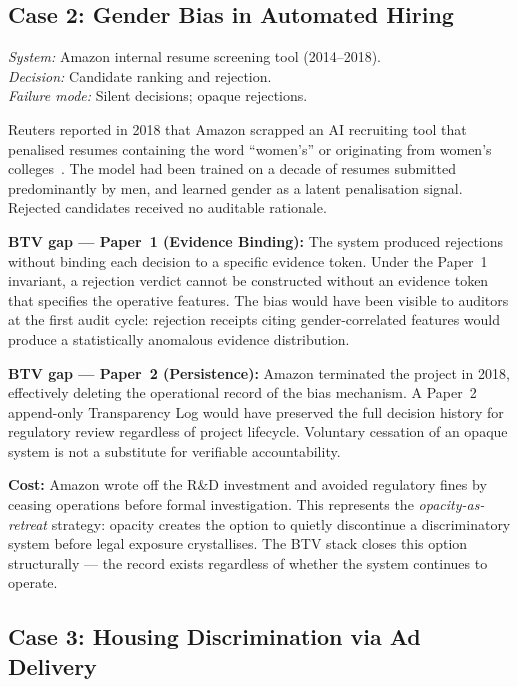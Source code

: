\subsection{Case 2: Gender Bias in Automated Hiring}
\label{subsec:amazon}

\noindent\textit{System:} Amazon internal resume screening tool (2014--2018).\\
\textit{Decision:} Candidate ranking and rejection.\\
\textit{Failure mode:} Silent decisions; opaque rejections.

Reuters reported in 2018 that Amazon scrapped an AI recruiting tool
that penalised resumes containing the word ``women's'' or originating
from women's colleges~\cite{dastin2018amazon}. The model had been trained
on a decade of resumes submitted predominantly by men, and learned
gender as a latent penalisation signal. Rejected candidates received no
auditable rationale.

\textbf{BTV gap --- Paper~1 (Evidence Binding):} The system produced
rejections without binding each decision to a specific evidence token.
Under the Paper~1 invariant, a rejection verdict cannot be constructed
without an evidence token that specifies the operative features. The
bias would have been visible to auditors at the first audit cycle:
rejection receipts citing gender-correlated features would produce a
statistically anomalous evidence distribution.

\textbf{BTV gap --- Paper~2 (Persistence):} Amazon terminated the
project in 2018, effectively deleting the operational record of the
bias mechanism. A Paper~2 append-only Transparency Log would have
preserved the full decision history for regulatory review regardless of
project lifecycle. Voluntary cessation of an opaque system is not a
substitute for verifiable accountability.

\textbf{Cost:} Amazon wrote off the R\&D investment and avoided
regulatory fines by ceasing operations before formal investigation. This
represents the \emph{opacity-as-retreat} strategy: opacity creates the
option to quietly discontinue a discriminatory system before legal
exposure crystallises. The BTV stack closes this option structurally ---
the record exists regardless of whether the system continues to operate.

\subsection{Case 3: Housing Discrimination via Ad Delivery}
\label{subsec:meta}

